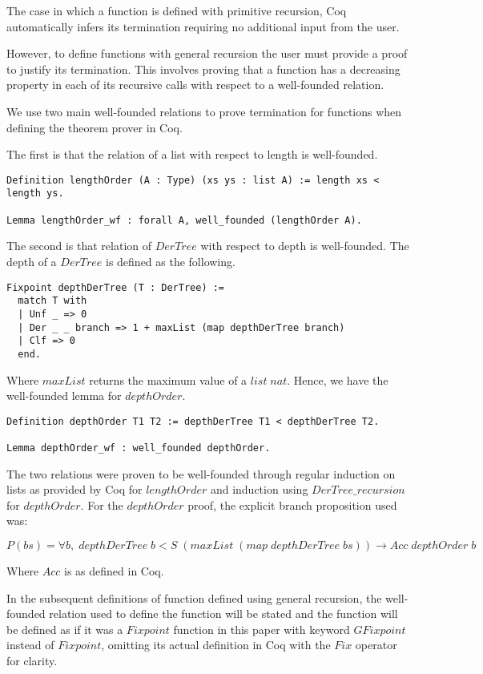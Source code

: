 The case in which a function is defined with primitive recursion, Coq
automatically infers its termination requiring no additional input from the
user.

However, to define functions with general recursion the user must provide a
proof to justify its termination. This involves proving that a function has a
decreasing property in each of its recursive calls with respect to a
well-founded relation.

We use two main well-founded relations to prove termination for functions when
defining the theorem prover in Coq.

The first is that the relation of a list with respect to length is
well-founded.

\begin{lstlisting}
Definition lengthOrder (A : Type) (xs ys : list A) := length xs < length ys.

Lemma lengthOrder_wf : forall A, well_founded (lengthOrder A).
\end{lstlisting}

The second is that relation of $DerTree$ with respect to depth is well-founded.
The depth of a $DerTree$ is defined as the following.

\begin{lstlisting}
Fixpoint depthDerTree (T : DerTree) :=
  match T with
  | Unf _ => 0
  | Der _ _ branch => 1 + maxList (map depthDerTree branch)
  | Clf => 0
  end.
\end{lstlisting}

Where $maxList$ returns the maximum value of a $list\;nat$. Hence, we have the
well-founded lemma for $depthOrder$.

\begin{lstlisting}
Definition depthOrder T1 T2 := depthDerTree T1 < depthDerTree T2.

Lemma depthOrder_wf : well_founded depthOrder.
\end{lstlisting}

The two relations were proven to be well-founded through regular induction on
lists as provided by Coq for $lengthOrder$ and induction using
$DerTree\_recursion$ for $depthOrder$. For the $depthOrder$ proof, the explicit
branch proposition used was:

$$P(bs) = \forall b,\; depthDerTree\; b < S\;(maxList\; (map\; depthDerTree
\;bs)) \rightarrow Acc\; depthOrder\; b$$

Where $Acc$ is as defined in Coq.

In the subsequent definitions of function defined using general recursion, the 
well-founded relation used to define the function will be stated and the
function will be defined as if it was a $Fixpoint$ function in this paper with
keyword $GFixpoint$ instead of $Fixpoint$, omitting its actual definition in
Coq with the $Fix$ operator for clarity.


